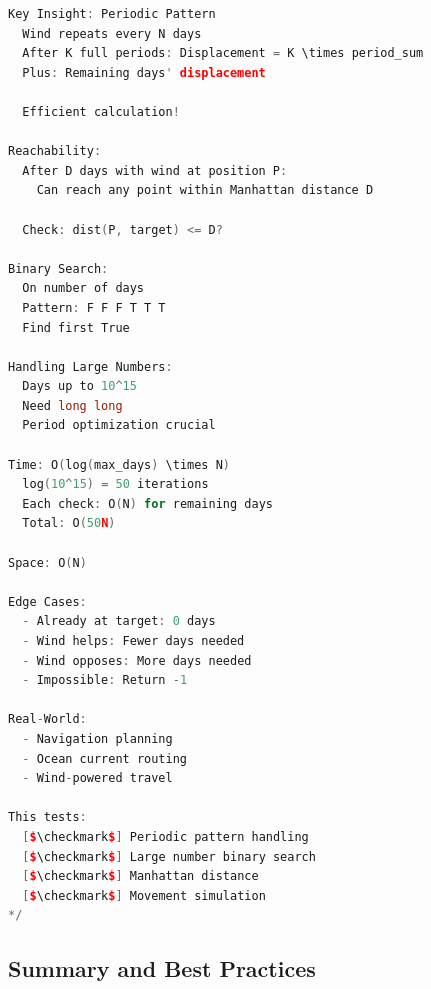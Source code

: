 \documentclass[11pt,a4paper,oneside]{book}
\begin{document}
\begin{lstlisting}[language=C++, caption=Distance Optimization - DETAILED SOLUTIONS]
Key Insight: Periodic Pattern
  Wind repeats every N days
  After K full periods: Displacement = K \times period_sum
  Plus: Remaining days' displacement
  
  Efficient calculation!

Reachability:
  After D days with wind at position P:
    Can reach any point within Manhattan distance D
    
  Check: dist(P, target) <= D?

Binary Search:
  On number of days
  Pattern: F F F T T T
  Find first True

Handling Large Numbers:
  Days up to 10^15
  Need long long
  Period optimization crucial

Time: O(log(max_days) \times N)
  log(10^15) = 50 iterations
  Each check: O(N) for remaining days
  Total: O(50N)

Space: O(N)

Edge Cases:
  - Already at target: 0 days
  - Wind helps: Fewer days needed
  - Wind opposes: More days needed
  - Impossible: Return -1

Real-World:
  - Navigation planning
  - Ocean current routing
  - Wind-powered travel

This tests:
  [$\checkmark$] Periodic pattern handling
  [$\checkmark$] Large number binary search
  [$\checkmark$] Manhattan distance
  [$\checkmark$] Movement simulation
*/
\end{lstlisting}

\subsection{Summary and Best Practices}
\end{document}
